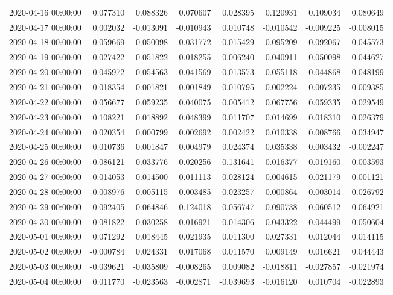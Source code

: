 \begin{tabular}{lrrrrrrr}
2020-04-16 00:00:00 & 0.077310 & 0.088326 & 0.070607 & 0.028395 & 0.120931 & 0.109034 & 0.080649 \\
2020-04-17 00:00:00 & 0.002032 & -0.013091 & -0.010943 & 0.010748 & -0.010542 & -0.009225 & -0.008015 \\
2020-04-18 00:00:00 & 0.059669 & 0.050098 & 0.031772 & 0.015429 & 0.095209 & 0.092067 & 0.045573 \\
2020-04-19 00:00:00 & -0.027422 & -0.051822 & -0.018255 & -0.006240 & -0.040911 & -0.050098 & -0.044627 \\
2020-04-20 00:00:00 & -0.045972 & -0.054563 & -0.041569 & -0.013573 & -0.055118 & -0.044868 & -0.048199 \\
2020-04-21 00:00:00 & 0.018354 & 0.001821 & 0.001849 & -0.010795 & 0.002224 & 0.007235 & 0.009385 \\
2020-04-22 00:00:00 & 0.056677 & 0.059235 & 0.040075 & 0.005412 & 0.067756 & 0.059335 & 0.029549 \\
2020-04-23 00:00:00 & 0.108221 & 0.018892 & 0.048399 & 0.011707 & 0.014699 & 0.018310 & 0.026379 \\
2020-04-24 00:00:00 & 0.020354 & 0.000799 & 0.002692 & 0.002422 & 0.010338 & 0.008766 & 0.034947 \\
2020-04-25 00:00:00 & 0.010736 & 0.001847 & 0.004979 & 0.024374 & 0.035338 & 0.003432 & -0.002247 \\
2020-04-26 00:00:00 & 0.086121 & 0.033776 & 0.020256 & 0.131641 & 0.016377 & -0.019160 & 0.003593 \\
2020-04-27 00:00:00 & 0.014053 & -0.014500 & 0.011113 & -0.028124 & -0.004615 & -0.021179 & -0.001121 \\
2020-04-28 00:00:00 & 0.008976 & -0.005115 & -0.003485 & -0.023257 & 0.000864 & 0.003014 & 0.026792 \\
2020-04-29 00:00:00 & 0.092405 & 0.064846 & 0.124018 & 0.056747 & 0.090738 & 0.060512 & 0.064921 \\
2020-04-30 00:00:00 & -0.081822 & -0.030258 & -0.016921 & 0.014306 & -0.043322 & -0.044499 & -0.050604 \\
2020-05-01 00:00:00 & 0.071292 & 0.018445 & 0.021935 & 0.011300 & 0.027331 & 0.012044 & 0.014115 \\
2020-05-02 00:00:00 & -0.000784 & 0.024331 & 0.017068 & 0.011570 & 0.009149 & 0.016621 & 0.044443 \\
2020-05-03 00:00:00 & -0.039621 & -0.035809 & -0.008265 & 0.009082 & -0.018811 & -0.027857 & -0.021974 \\
2020-05-04 00:00:00 & 0.011770 & -0.023563 & -0.002871 & -0.039693 & -0.016120 & 0.010704 & -0.022893 \\

\end{tabular}
